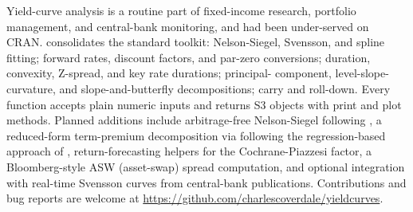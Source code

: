 Yield-curve analysis is a routine part of fixed-income research,
portfolio management, and central-bank monitoring, and had been
under-served on CRAN.  consolidates the standard
toolkit: Nelson-Siegel, Svensson, and spline fitting; forward rates,
discount factors, and par-zero conversions; duration, convexity,
Z-spread, and key rate durations; principal- component,
level-slope-curvature, and slope-and-butterfly decompositions; carry and
roll-down. Every function accepts plain numeric inputs and returns S3
objects with print and plot methods. Planned additions include
arbitrage-free Nelson-Siegel following \citet{christensen2011affine}, a
reduced-form term-premium decomposition via 
following the regression-based approach of \citet{adrian2013pricing},
return-forecasting helpers for the Cochrane-Piazzesi factor, a
Bloomberg-style ASW (asset-swap) spread computation, and optional
integration with real-time Svensson curves from central-bank
publications. Contributions and bug reports are welcome at
\url{https://github.com/charlescoverdale/yieldcurves}.



\address{%
Charles Coverdale\\
London, United Kingdom\\%
United Kingdom\\
%
\url{https://github.com/charlescoverdale/yieldcurves}\\%
%
\href{mailto:charles.f.coverdale@gmail.com}{\nolinkurl{charles.f.coverdale@gmail.com}}%
}
